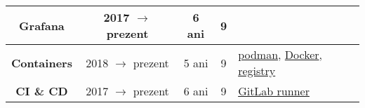 \documentclass[utf8x,helvetica,narrow,romanian,logo,totpages]{europecv}
\newcommand{\years}{ani}
\newcommand{\present}{prezent}
\begin{document}
\begin{europecv}
{\begin{tabular}{ | c | c | c | c | >{\centering\arraybackslash}p{2.282cm} |}
    \textbf{\hspace{-0.2cm} Grafana \hspace{-0.20cm}}
        & 2017 $\to$ \present
        & 6 \years
        & 9
        &
    \\ \hline

    \textbf{\hspace{-0.2cm} Containers \hspace{-0.20cm}}
        & 2018 $\to$ \present
        & 5 \years
        & 9
        & \href{https://podman.io/}{podman}, \href{https://www.docker.com/}{Docker}, \href{https://hub.docker.com/_/registry}{registry}
    \\ \hline

    \textbf{\hspace{-0.2cm} CI \& CD \hspace{-0.20cm}}
        & 2017 $\to$ \present
        & 6 \years
        & 9
        & \href{https://docs.gitlab.com/runner/}{GitLab runner}
    \\ \hline

\end{tabular}
}



\end{europecv}
\end{document}

